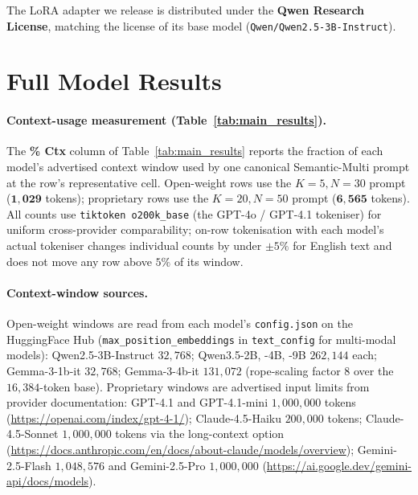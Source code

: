 \documentclass[11pt]{article}
\begin{document}
The LoRA adapter we release is distributed under the
\textbf{Qwen Research License}, matching the license of its base
model (\texttt{Qwen/Qwen2.5-3B-Instruct}).

\section{Full Model Results}
\label{app:full_results}

\paragraph{Context-usage measurement (Table~\ref{tab:main_results}).}
The \textbf{\% Ctx} column of Table~\ref{tab:main_results} reports the
fraction of each model's advertised context window used by one
canonical Semantic-Multi prompt at the row's representative cell.
Open-weight rows use the $K{=}5, N{=}30$ prompt
($\mathbf{1{,}029}$ tokens); proprietary rows use the $K{=}20, N{=}50$
prompt ($\mathbf{6{,}565}$ tokens). All counts use
\texttt{tiktoken o200k\_base} (the GPT-4o / GPT-4.1 tokeniser) for
uniform cross-provider comparability; on-row tokenisation with each
model's actual tokeniser changes individual counts by under
$\pm 5\%$ for English text and does not move any row above $5\%$ of
its window.

\paragraph{Context-window sources.}
Open-weight windows are read from each model's
\texttt{config.json} on the HuggingFace Hub
(\texttt{max\_position\_embeddings} in
\texttt{text\_config} for multi-modal models):
Qwen2.5-3B-Instruct $32{,}768$;
Qwen3.5-2B, -4B, -9B $262{,}144$ each;
Gemma-3-1b-it $32{,}768$;
Gemma-3-4b-it $131{,}072$ (rope-scaling factor 8 over the
$16{,}384$-token base).
Proprietary windows are advertised input limits from provider
documentation:
GPT-4.1 and GPT-4.1-mini $1{,}000{,}000$ tokens
(\url{https://openai.com/index/gpt-4-1/});
Claude-4.5-Haiku $200{,}000$ tokens; Claude-4.5-Sonnet $1{,}000{,}000$
tokens via the long-context option
(\url{https://docs.anthropic.com/en/docs/about-claude/models/overview});
Gemini-2.5-Flash $1{,}048{,}576$ and Gemini-2.5-Pro $1{,}000{,}000$
(\url{https://ai.google.dev/gemini-api/docs/models}).

\end{document}
